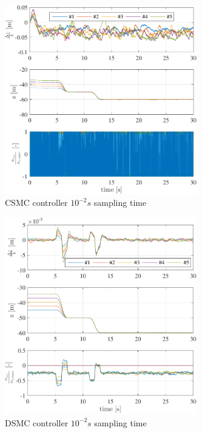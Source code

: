 \documentclass{ifacconf}
\begin{document}
\begin{figure}
\begin{center}
\includegraphics[width=8.4cm]{STSMC-100Hz-TIMESCALESEPARATION-turbulence=1}    %
\caption{ CSMC controller $10^{-2} s$ sampling time}
\label{fig:CSMC100Hz}
\end{center}
\end{figure}

\begin{figure}
\begin{center}
\includegraphics[width=8.4cm]{DSMC-100Hz-TIMESCALESEPARATION-turbulence=1}    %
\caption{ DSMC controller $10^{-2} s$ sampling time}
\label{fig:DSMC100Hz}
\end{center}
\end{figure}
\end{document}
